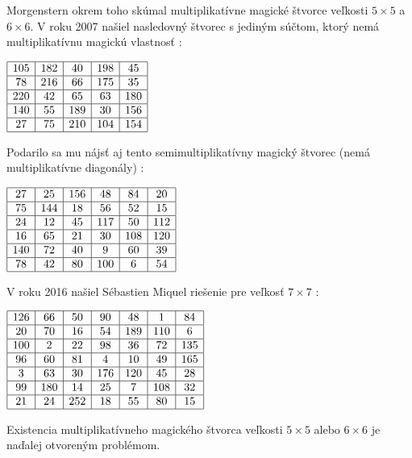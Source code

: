 Morgenstern okrem toho skúmal multiplikatívne magické štvorce veľkosti $5 \times 5$ a $6 \times 6$. V roku 2007 našiel nasledovný štvorec s jediným súčtom, ktorý nemá multiplikatívnu magickú vlastnosť \cite{multimagie}:

\begin{center}
$\begin{array}{ |c|c|c|c|c| }
\hline
105 & 182 & 40 & 198 & 45 \\ 
\hline
78 & 216 & 66 & 175 & 35  \\ 
\hline
220 & 42 & 65 & 63 & 180 \\ 
\hline
140 & 55 & 189 & 30 & 156 \\ 
\hline
27 & 75 & 210 & 104 & 154 \\ 
\hline
\end{array}$
\end{center}

Podarilo sa mu nájsť aj tento semimultiplikatívny magický štvorec (nemá multiplikatívne diagonály) \cite{multimagie}:

\begin{center}
$\begin{array}{ |c|c|c|c|c|c| }
\hline
27 & 25 & 156 & 48 & 84 & 20 \\ 
\hline
75 & 144 & 18 & 56 & 52 & 15 \\ 
\hline
24 & 12 & 45 & 117 & 50 & 112 \\ 
\hline
16 & 65 & 21 & 30 & 108 & 120 \\ 
\hline
140 & 72 & 40 & 9 & 60 & 39 \\ 
\hline
78 & 42 & 80 & 100 & 6 & 54 \\
\hline
\end{array}$
\end{center}

V roku 2016 našiel Sébastien Miquel riešenie pre veľkosť $7 \times 7$  \cite{multimagie}:

\begin{center}
$\begin{array}{ |c|c|c|c|c|c|c| } 
\hline
126 & 66 & 50 & 90 & 48 & 1 & 84 \\ 
\hline
20 & 70 & 16 & 54 & 189 & 110 & 6 \\ 
\hline
100 & 2 & 22 & 98 & 36 & 72 & 135 \\
\hline
96 & 60 & 81 & 4 & 10 & 49 & 165 \\
\hline
3 & 63 & 30 & 176 & 120 & 45 & 28 \\
\hline
99 & 180 & 14 & 25 & 7 & 108 & 32 \\
\hline
21 & 24 & 252 & 18 & 55 & 80 & 15 \\
\hline
\end{array}$
\end{center}

Existencia multiplikatívneho magického štvorca veľkosti $5 \times 5$ alebo $6 \times 6$ je naďalej otvoreným problémom.











